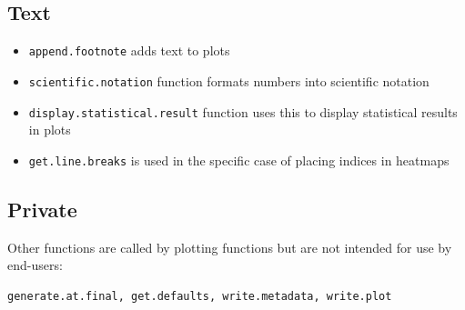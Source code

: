 \documentclass[letterpaper]{report}\usepackage[]{graphicx}\usepackage[]{color}
\begin{document}
\subsection{Text}
\begin{itemize}
\item \texttt{append.footnote} adds text to plots
\item \texttt{scientific.notation} function formats numbers into scientific notation
\item \texttt{display.statistical.result} function uses this to display statistical results in plots
\item \texttt{get.line.breaks} is used in the specific case of placing indices in heatmaps
\end{itemize}

\subsection{Private}
Other functions are called by plotting functions but are not intended for use by end-users: 
\begin{verbatim}
generate.at.final, get.defaults, write.metadata, write.plot
\end{verbatim}
\end{document}
